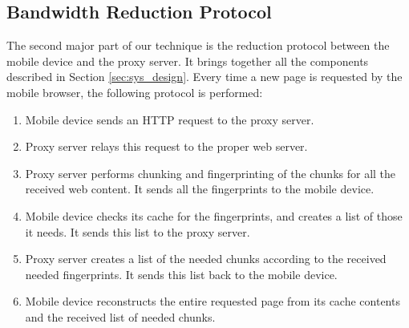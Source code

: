 \subsection{Bandwidth Reduction Protocol}
\label{sec:protocol}
The second major part of our technique is the reduction protocol between the mobile device and the proxy server. It brings together all the components described in Section \ref{sec:sys_design}. Every time a new page is requested by the mobile browser, the following protocol is performed:
\begin{enumerate}
\item Mobile device sends an HTTP request to the proxy server.
\item Proxy server relays this request to the proper web server.
\item Proxy server performs chunking and fingerprinting of the chunks for all the received web content. It sends all the fingerprints to the mobile device.
\item Mobile device checks its cache for the fingerprints, and creates a list of those it needs. It sends this list to the proxy server.
\item Proxy server creates a list of the needed chunks according to the received needed fingerprints. It sends this list back to the mobile device.
\item Mobile device reconstructs the entire requested page from its cache contents and the received list of needed chunks.
\end{enumerate}




